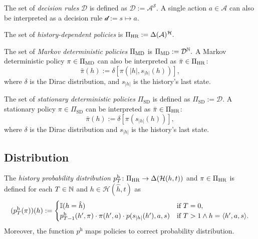 \begin{definition} \label{def:decision-rule}
The set of \emph{decision rules} $\mathcal{D}$ is defined as \(\mathcal{D} := \mathcal{A}^{\mathcal{S}}. \) A single action $a \in \mathcal{A}$ can also be interpreted as a decision rule $\mathcal{d} := s \mapsto a$.
\leanok
\end{definition}

\begin{definition} \label{def:policy-hr}
The set of \emph{history-dependent policies} is \(\Pi_{\mathrm{HR}} :=  \Delta(\mathcal{A})^{\mathcal{H}}. \)
 \leanok
\end{definition}


\begin{definition} \label{def:policy-md}
The set of \emph{Markov deterministic policies} $\Pi_{\mathrm{MD}}$ is \(\Pi_{\mathrm{MD}} :=  \mathcal{D}^{\mathbb{N}}. \)
A Markov deterministic policy $\pi \in \Pi_{\mathrm{MD}}$ can also be interpreted as $\bar{\pi} \in \Pi_{\mathrm{HR}}$:
\[
  \bar{\pi}(h) := \delta \left[  \pi(|h|, s_{|h|}(h)) \right],
\]
where $\delta$ is the Dirac distribution,  and $s_{|h|}$ is the history's last state.
\leanok
\end{definition}

\begin{definition} \label{def:policy-sd}
The set of \emph{stationary deterministic policies} $\Pi_{\mathrm{SD}}$ is defined as \(\Pi_{\mathrm{SD}} := \mathcal{D}. \)
A stationary policy $\pi \in \Pi_{\mathrm{SD}}$ can be interpreted as $\bar{\pi} \in \Pi_{\mathrm{HR}}$:
\[
  \bar{\pi}(h) := \delta \left[  \pi(s_{|h|}(h)) \right],
\]
where $\delta$ is the Dirac distribution and $s_{|h|}$ is the history's last state.
\leanok
\end{definition}

\subsection{Distribution}


\begin{definition}\label{def:hist-dist}
The \emph{history probability distribution} $p^{\mathrm{h}}_T \colon  \Pi_{\mathrm{HR}} \to \Delta(\mathcal{H}(h,t))$  and $\pi \in \Pi_{\mathrm{HR}}$ is defined for each $T \in \mathbb{N}$ and $h\in \mathcal{H}(\hat{h},t)$ as
\[
(p^{\mathrm{h}}_T(\pi))(h) :=
\begin{cases}
\mathbb{I}(h = \hat{h}) &\text{if } T = 0, \\
p_{T-1}^{\mathrm{h}}(h', \pi) \cdot \pi(h',a) \cdot  p(s_{|h|}(h'), a , s) &\text{if } T > 1 \wedge h = \langle h', a, s \rangle.
\end{cases}
\]
Moreover, the function $p^{\mathrm{h}}$ maps policies to correct probability distribution.
 \leanok
\end{definition}

